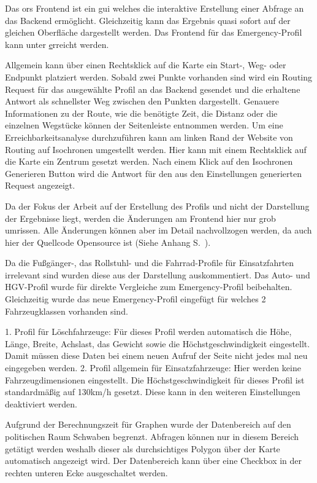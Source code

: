 Das \gls{ors} Frontend ist ein \gls{gui} welches die interaktive Erstellung einer Abfrage an das Backend ermöglicht.
Gleichzeitig kann das Ergebnis quasi sofort auf der gleichen Oberfläche dargestellt werden.
Das Frontend für das Emergency-Profil kann unter \href{www.emergency.openrouteservice.org} erreicht werden.

\bigskip

Allgemein kann über einen Rechtsklick auf die Karte ein Start-, Weg- oder Endpunkt platziert werden.
Sobald zwei Punkte vorhanden sind wird ein Routing Request für das ausgewählte Profil an das Backend gesendet und die erhaltene Antwort als schnellster Weg zwischen den Punkten dargestellt.
Genauere Informationen zu der Route, wie die benötigte Zeit, die Distanz oder die einzelnen Wegstücke können der Seitenleiste entnommen werden.
Um eine Erreichbarkeitsanalyse durchzuführen kann am linken Rand der Website von Routing auf Isochronen umgestellt werden.
Hier kann mit einem Rechtsklick auf die Karte ein Zentrum gesetzt werden.
Nach einem Klick auf den Isochronen Generieren Button wird die Antwort für den aus den Einstellungen generierten Request angezeigt.

\bigskip

Da der Fokus der Arbeit auf der Erstellung des Profils und nicht der Darstellung der Ergebnisse liegt, werden die Änderungen am Frontend hier nur grob umrissen.
Alle Änderungen können aber im Detail nachvollzogen werden, da auch hier der Quellcode Opensource ist (Siehe Anhang S.~\pageref{sec:anhang}).

\bigskip

Da die Fußgänger-, das Rollstuhl- und die Fahrrad-Profile für Einsatzfahrten irrelevant sind wurden diese aus der Darstellung auskommentiert.
Das Auto- und HGV-Profil wurde für direkte Vergleiche zum Emergency-Profil beibehalten.
Gleichzeitig wurde das neue Emergency-Profil eingefügt für welches 2 Fahrzeugklassen vorhanden sind.

\bigskip

1. Profil für Löschfahrzeuge: Für dieses Profil werden automatisch die Höhe, Länge, Breite, Achslast, das Gewicht sowie die Höchstgeschwindigkeit eingestellt.
Damit müssen diese Daten bei einem neuen Aufruf der Seite nicht jedes mal neu eingegeben werden.
2. Profil allgemein für Einsatzfahrzeuge: Hier werden keine Fahrzeugdimensionen eingestellt.
Die Höchstgeschwindigkeit für dieses Profil ist standardmäßig auf 130km/h gesetzt.
Diese kann in den weiteren Einstellungen deaktiviert werden.

\bigskip

Aufgrund der Berechnungszeit für Graphen wurde der Datenbereich auf den politischen Raum Schwaben begrenzt.
Abfragen können nur in diesem Bereich getätigt werden weshalb dieser als durchsichtiges Polygon über der Karte automatisch angezeigt wird.
Der Datenbereich kann über eine Checkbox in der rechten unteren Ecke ausgeschaltet werden.
